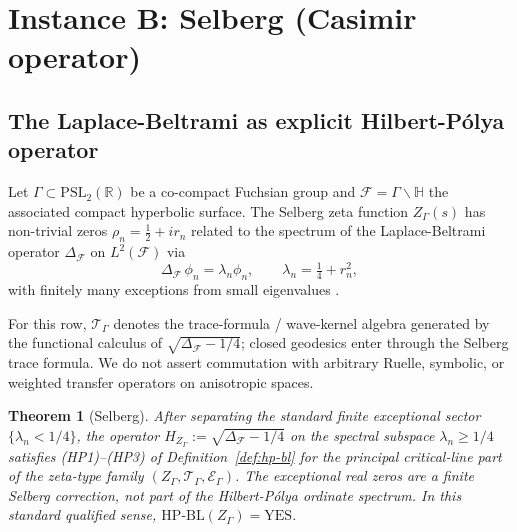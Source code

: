 \documentclass[11pt]{article}
\newtheorem{theorem}{Theorem}[section]
\theoremstyle{definition}
\theoremstyle{remark}
\newcommand{\HBL}{\mathrm{HP\text{-}BL}}
\newcommand{\PSL}{\mathrm{PSL}}
\newcommand{\halfline}{\tfrac{1}{2}}
\begin{document}
\section{Instance B: Selberg (Casimir operator)}
\label{sec:selberg}

\subsection{The Laplace-Beltrami as explicit Hilbert-P\'olya operator}

Let $\Gamma \subset \PSL_2(\mathbb{R})$ be a co-compact Fuchsian group
and $\mathcal{F} = \Gamma\backslash\mathbb{H}$ the associated compact
hyperbolic surface. The Selberg zeta function $Z_\Gamma(s)$ has
non-trivial zeros $\rho_n = \halfline + ir_n$ related to the spectrum
of the Laplace-Beltrami operator $\Delta_\mathcal{F}$ on
$L^2(\mathcal{F})$ via
\begin{equation}
\label{eq:selberg-spectral}
  \Delta_\mathcal{F}\,\phi_n = \lambda_n\phi_n, \qquad
  \lambda_n = \tfrac{1}{4} + r_n^2,
\end{equation}
with finitely many exceptions from small eigenvalues
\cite{Selberg1956,Marklof2008}.

For this row, $\mathcal{T}_\Gamma$ denotes the trace-formula /
wave-kernel algebra generated by the functional calculus of
$\sqrt{\Delta_\mathcal{F}-1/4}$; closed geodesics enter through the
Selberg trace formula. We do not assert commutation with arbitrary
Ruelle, symbolic, or weighted transfer operators on anisotropic spaces.

\begin{theorem}[Selberg]\label{thm:selberg-hp}
After separating the standard finite exceptional sector
$\{\lambda_n<1/4\}$, the operator
$H_{Z_\Gamma}:=\sqrt{\Delta_\mathcal{F}-1/4}$ on the spectral subspace
$\lambda_n\geq 1/4$ satisfies (HP1)--(HP3) of
Definition~\ref{def:hp-bl} for the principal critical-line part of
the zeta-type family
$(Z_\Gamma, \mathcal{T}_\Gamma, \mathcal{E}_\Gamma)$. The exceptional
real zeros are a finite Selberg correction, not part of the
Hilbert-P\'olya ordinate spectrum. In this standard qualified sense,
$\HBL(Z_\Gamma)=\mathrm{YES}$.
\end{theorem}
\end{document}
